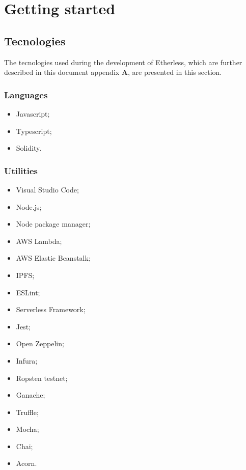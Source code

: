 \section{Getting started}
\subsection{Tecnologies}
The tecnologies used during the development of Etherless, which are further described in this document appendix \textbf{A}, are presented in this section.
\subsubsection{Languages}
\begin{itemize}
	\item Javascript;
	\item Typescript;
	\item Solidity.
\end{itemize}
\subsubsection{Utilities}
\begin{itemize}
	\item Visual Studio Code;
	\item Node.js;
	\item Node package manager;
	\item AWS Lambda;
	\item AWS Elastic Beanstalk;
	\item IPFS;
	\item ESLint;
	\item Serverless Framework;
	\item Jest;
	\item Open Zeppelin;
	\item Infura;
	\item Ropsten testnet;
	\item Ganache;
	\item Truffle;
	\item Mocha;
	\item Chai;
	\item Acorn.
\end{itemize}
\pagebreak
